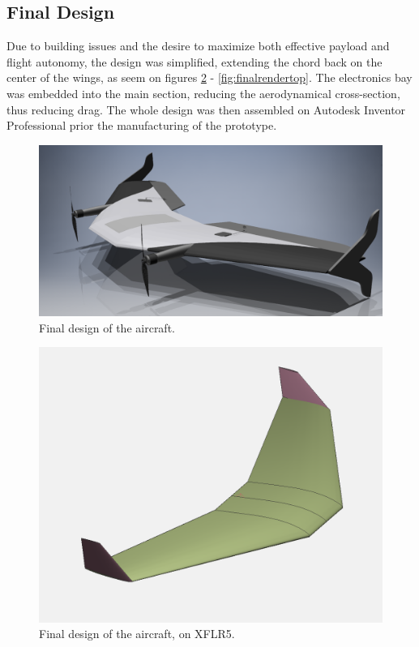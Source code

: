 \subsection{Final Design}

Due to building issues and the desire to maximize both effective payload and flight autonomy, the design was simplified, extending the chord back on the center of the wings, as seem on figures \ref{fig:final} - \ref{fig:finalrendertop}.
The electronics bay was embedded into the main section, reducing the aerodynamical cross-section, thus reducing drag. The whole design was then assembled on Autodesk Inventor Professional prior the manufacturing of the prototype.

\begin{figure}
\centering
  \includegraphics[width=\linewidth]{figs/finalrender.png}
  \caption{Final design of the aircraft.}
  \label{fig:finalrender}
\end{figure}

\begin{figure}
\centering
  \includegraphics[width=\linewidth]{figs/final.png}
  \caption{Final design of the aircraft, on XFLR5.}
  \label{fig:final}
\end{figure}
	


